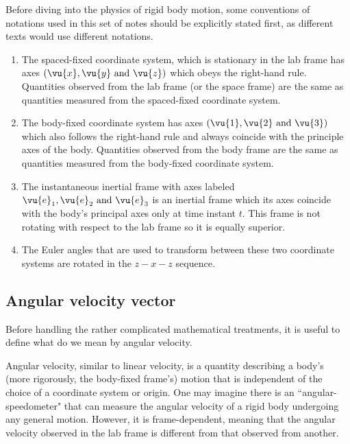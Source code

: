 \documentclass[a4paper,12pt]{report}
\begin{document}
Before diving into the physics of rigid body motion, some conventions of notations used in this set of notes should be explicitly stated first, as different texts would use different notations. 

\begin{enumerate}
	\item The spaced-fixed coordinate system, which is stationary in the lab frame has axes \((\vu{x}, \vu{y} \text{ and } \vu{z} )\) which obeys the right-hand rule. Quantities observed from the lab frame (or the space frame) are the same as quantities measured from the spaced-fixed coordinate system.

	\item The body-fixed coordinate system has axes \((\vu{1 }, \vu{2 } \text{ and } \vu{3 })\) which also follows the right-hand rule and always coincide with the principle axes of the body. Quantities observed from the body frame are the same as quantities measured from the body-fixed coordinate system.

	\item The instantaneous inertial frame with axes labeled \(\vu{e} _{1},\vu{e} _{2} \text{ and } \vu{e} _{3} \) is an inertial frame which its axes coincide with the body's principal axes only at time instant \(t\). This frame is not rotating with respect to the lab frame so it is equally superior. 
	
	\item The Euler angles that are used to transform between these two coordinate systems are rotated in the \(z-x-z\) sequence. 
\end{enumerate}

\subsection{Angular velocity vector}
Before handling the rather complicated mathematical treatments, it is useful to define what do we mean by angular velocity. 

Angular velocity, similar to linear velocity, is a quantity describing a body's (more rigorously, the body-fixed frame's) motion that is independent of the choice of a coordinate system or origin. One may imagine there is an ``angular-speedometer" that can measure the angular velocity of a rigid body undergoing any general motion. However, it is frame-dependent, meaning that the angular velocity observed in the lab frame is different from that observed from another. 
\end{document}
